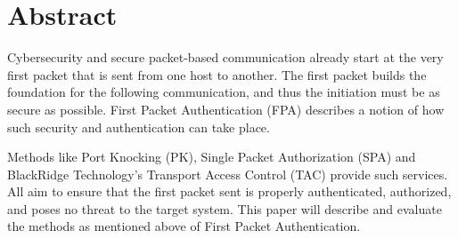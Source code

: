 \section{Abstract}
Cybersecurity and secure packet-based communication already start at the very first packet that is sent from one host to another.  The first packet builds the foundation for the following communication, and thus the initiation must be as secure as possible.  First Packet Authentication (FPA) describes a notion of how such security and authentication can take place.  \par
Methods like Port Knocking (PK), Single Packet Authorization (SPA) and BlackRidge Technology's Transport Access Control (TAC) provide such services.  All aim to ensure that the first packet sent is properly authenticated, authorized, and poses no threat to the target system.  This paper will describe and evaluate the methods as mentioned above of First Packet Authentication.\\\par